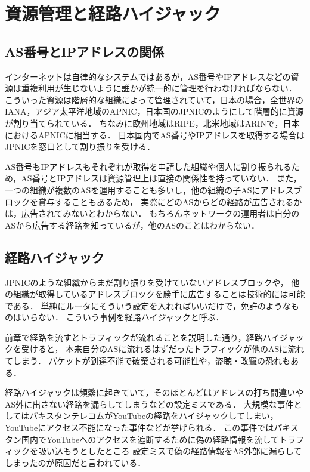 \section{資源管理と経路ハイジャック}

\subsection{AS番号とIPアドレスの関係}

インターネットは自律的なシステムではあるが，AS番号やIPアドレスなどの資源は重複利用が生じないように誰かが統一的に管理を行わなければならない．
こういった資源は階層的な組織によって管理されていて，日本の場合，全世界のIANA，アジア太平洋地域のAPNIC，日本国のJPNICのようにして階層的に資源が割り当てられている．
ちなみに欧州地域はRIPE，北米地域はARINで，日本におけるAPNICに相当する．
日本国内でAS番号やIPアドレスを取得する場合はJPNICを窓口として割り振りを受ける．

AS番号もIPアドレスもそれぞれが取得を申請した組織や個人に割り振られるため，AS番号とIPアドレスは資源管理上は直接の関係性を持っていない．
また，一つの組織が複数のASを運用することも多いし，他の組織の子ASにアドレスブロックを貸与することもあるため，
実際にどのASからどの経路が広告されるかは，広告されてみないとわからない．
もちろんネットワークの運用者は自分のASから広告する経路を知っているが，他のASのことはわからない．

\subsection{経路ハイジャック}

JPNICのような組織からまだ割り振りを受けていないアドレスブロックや，
他の組織が取得しているアドレスブロックを勝手に広告することは技術的には可能である．
単純にルータにそういう設定を入れればいいだけで，免許のようなものはいらない．
こういう事例を経路ハイジャックと呼ぶ．

前章で経路を流すとトラフィックが流れることを説明した通り，経路ハイジャックを受けると，
本来自分のASに流れるはずだったトラフィックが他のASに流れてしまう．
パケットが到達不能で破棄される可能性や，盗聴・改竄の恐れもある．

経路ハイジャックは頻繁に起きていて，そのほとんどはアドレスの打ち間違いやAS外に出さない経路を漏らしてしまうなどの設定ミスである．
大規模な事件としてはパキスタンテレコムがYouTubeの経路をハイジャックしてしまい，YouTubeにアクセス不能になった事件などが挙げられる．
この事件ではパキスタン国内でYouTubeへのアクセスを遮断するために偽の経路情報を流してトラフィックを吸い込もうとしたところ
設定ミスで偽の経路情報をAS外部に漏らしてしまったのが原因だと言われている．

